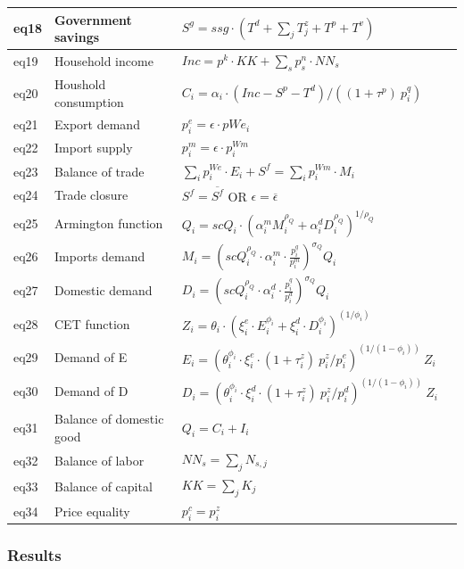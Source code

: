 \begin{table}[!h]
\begin{tabular}{llll}
		eq18 & Government savings & $S^g = ssg \cdot  (T^d + \sum_j T^z_j + T^p + T^v)$ \\
		\midrule
		eq19 & Household income &  $Inc = p^k \cdot KK + \sum_s p^n_s \cdot NN_s $ \\
		eq20 & Houshold consumption & $C_i = \alpha_i \cdot  (Inc -S^p - T^d) / ((1+\tau^p) ~ p^q_i) $ \\
		\midrule
		eq21 & Export demand & $p^e_i = \epsilon \cdot pWe_i$ \\
		eq22 & Import supply & $p^m_i =\epsilon \cdot p^{Wm}_i$ \\
		eq23 & Balance of trade & $\sum_i p^{We}_i \cdot E_i +S^f = \sum_i p^{Wm}_i \cdot M_i$ \\
		eq24 & Trade closure & $S^f = \overline{S^f}$  \quad OR \quad $\epsilon = \overline{\epsilon}$  \\
		\midrule
		eq25 & Armington function & $Q_i = scQ_i \cdot (\alpha^m_i M_i^{\rho_Q} + \alpha^d_i D_i^{\rho_Q}  )^{1/\rho_Q} $ \\
		eq26 & Imports demand & $M_i = \left( scQ_i^{\rho_Q} \cdot \alpha_i^m \cdot \frac{p_i^q}{p_i^m} \right)^{\sigma_Q} Q_i$ \\
		eq27& Domestic demand & $D_i = \left( scQ_i^{\rho_Q} \cdot \alpha_i^d \cdot \frac{p_i^q}{p_i^d} \right)^{\sigma_Q} Q_i$ \\
		eq28 & CET function & $Z_i  = \theta_i \cdot  (\xi^e_i \cdot E_i^{\phi_i} + \xi^d_i \cdot D_i^{\phi_i} )^{(1/\phi_i)} $  \\
		eq29 & Demand of E & $  E_i = (\theta_i^{\phi_i} \cdot \xi^e_i\cdot (1+\tau^z_i) ~ p^z_i/p^e_i)^{(1/(1-\phi_i))} ~Z_i $ \\
		eq30 & Demand of D & $ D_i = (\theta_i^{\phi_i} \cdot \xi^d_i \cdot (1+\tau^z_i) ~ p^z_i/p^d_i)^{(1/(1-\phi_i))} ~ Z_i $ \\
		\midrule
		eq31 &  Balance of domestic good & $Q_i = C_i + I_i$ &  \\
		eq32 & Balance of labor & $NN_s = \sum_j N_{s,j}$ &   \\
		eq33 & Balance of capital & $KK  = \sum_j K_j $ &   \\
		eq34 & Price equality & $p^c_i = p^z_i$ & \\ 
		\bottomrule
	\end{tabular}
\end{table}

\clearpage

\subsubsection{Results}

